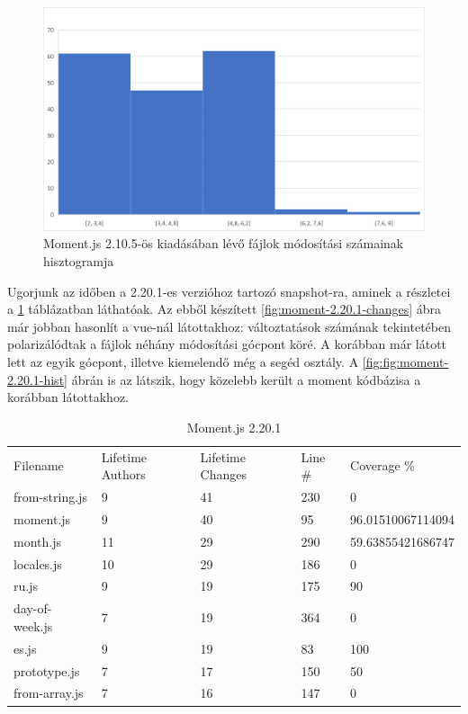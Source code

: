 \begin{figure}[H]
    \centering
    \includegraphics[width=1\textwidth]{images/moment/moment-2.10.5-hist.png}
    \caption{Moment.js 2.10.5-ös kiadásában lévő fájlok módosítási számainak hisztogramja}
    \label{fig:moment-2.10.1-hist}
\end{figure}

Ugorjunk az időben a 2.20.1-es verzióhoz tartozó snapshot-ra, aminek a részletei a \ref{tab:moment-2.20.1} táblázatban láthatóak. Az ebből készített \ref{fig:moment-2.20.1-changes} ábra már jobban hasonlít a vue-nál látottakhoz: változtatások számának tekintetében polarizálódtak a fájlok néhány módosítási gócpont köré. A korábban már látott  lett az egyik gócpont, illetve kiemelendő még a  segéd osztály. A \ref{fig:fig:moment-2.20.1-hist} ábrán is az látszik, hogy közelebb került a moment kódbázisa a korábban látottakhoz.

\begin{table}[h]
    \centering
    \begin{tabular}{l|l|l|l|l}
        Filename       & Lifetime Authors & Lifetime Changes & Line \# & Coverage \%       \\
        from-string.js & 9                & 41               & 230     & 0                 \\
        moment.js      & 9                & 40               & 95      & 96.01510067114094 \\
        month.js       & 11               & 29               & 290     & 59.63855421686747 \\
        locales.js     & 10               & 29               & 186     & 0                 \\
        ru.js          & 9                & 19               & 175     & 90                \\
        day-of-week.js & 7                & 19               & 364     & 0                 \\
        es.js          & 9                & 19               & 83      & 100               \\
        prototype.js   & 7                & 17               & 150     & 50                \\
        from-array.js  & 7                & 16               & 147     & 0
    \end{tabular}
    \caption{Moment.js 2.20.1}
    \label{tab:moment-2.20.1}
\end{table}

